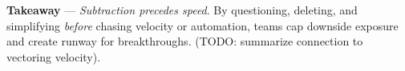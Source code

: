 \noindent
\textbf{Takeaway} --- \emph{Subtraction precedes speed}.
By questioning, deleting, and simplifying \textit{before} chasing velocity or
automation, teams cap downside exposure and create runway for breakthroughs.
(TODO: summarize connection to vectoring velocity).

